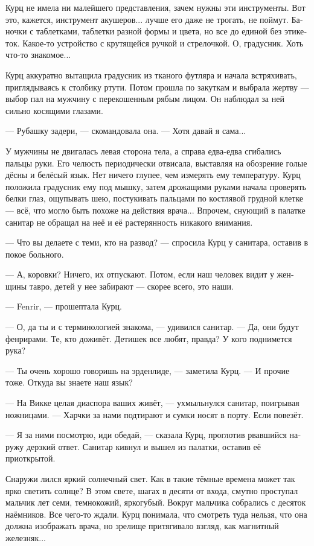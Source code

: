 \documentclass[a4paper,12pt,fleqn]{book}\usepackage{cooltooltips}\usepackage{polyglossia}\setdefaultlanguage[babelshorthands=true]{russian}\setotherlanguage{english}\defaultfontfeatures{Ligatures=TeX,Mapping=tex-text} \usepackage{xcolor}\definecolor{lightgray}{HTML}{bbbbbb}\color{lightgray}\newcommand{\ml}[3]{\textenglish{\textcolor{black}{#3}}}
\begin{document}
Курц не имела ни малейшего представления, зачем нужны эти инструменты.
Вот это, кажется, инструмент акушеров... лучше его даже не трогать, не поймут.
Баночки с таблетками, таблетки разной формы и цвета, но все до единой без этикеток.
Какое-то устройство с крутящейся ручкой и стрелочкой.
О, градусник.
Хоть что-то знакомое...

Курц аккуратно вытащила градусник из тканого футляра и начала встряхивать, приглядываясь к столбику ртути.
Потом прошла по закуткам и выбрала жертву --- выбор пал на мужчину с перекошенным рябым лицом.
Он наблюдал за ней сильно косящими глазами.

--- Рубашку задери, --- скомандовала она.
--- Хотя давай я сама...

У мужчины не двигалась левая сторона тела, а справа едва-едва сгибались пальцы руки.
Его челюсть периодически отвисала, выставляя на обозрение голые дёсны и белёсый язык.
Нет ничего глупее, чем измерять ему температуру.
Курц положила градусник ему под мышку, затем дрожащими руками начала проверять белки глаз, ощупывать шею, постукивать пальцами по костлявой грудной клетке --- всё, что могло быть похоже на действия врача...
Впрочем, снующий в палатке санитар не обращал на неё и её растерянность никакого внимания.

--- Что вы делаете с теми, кто на развод? --- спросила Курц у санитара, оставив в покое больного.

--- А, коровки?
Ничего, их отпускают.
Потом, если наш человек видит у женщины тавро, детей у нее забирают --- скорее всего, это наши.

--- Fenrir, --- прошептала Курц.

--- О, да ты и с терминологией знакома, --- удивился санитар.
--- Да, они будут фенрирами.
Те, кто доживёт.
Детишек все любят, правда?
У кого поднимется рука?

--- Ты очень хорошо говоришь на эрденлиде, --- заметила Курц.
--- И прочие тоже.
Откуда вы знаете наш язык?

--- На Викке целая диаспора ваших живёт, --- ухмыльнулся санитар, поигрывая ножницами.
--- Харчки за нами подтирают и сумки носят в порту.
Если повезёт.

--- Я за ними посмотрю, иди обедай, --- сказала Курц, проглотив рвавшийся наружу дерзкий ответ.
Санитар кивнул и вышел из палатки, оставив её приоткрытой.

Снаружи лился яркий солнечный свет.
Как в такие тёмные времена может так ярко светить солнце?
В этом свете, шагах в десяти от входа, смутно проступал мальчик лет семи, темнокожий, яркогубый.
Вокруг мальчика собрались с десяток наёмников.
Все чего-то ждали.
Курц понимала, что смотреть туда нельзя, что она должна изображать врача, но зрелище притягивало взгляд, как магнитный железняк...
\end{document}
